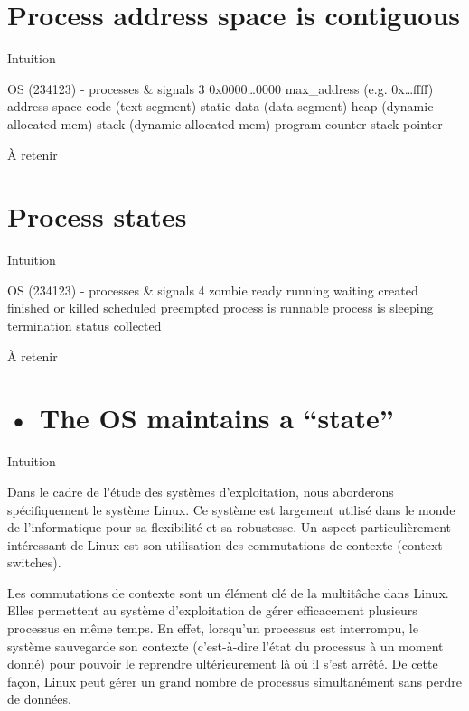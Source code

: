 \documentclass[12pt]{article}
\begin{document}
\section{Process address space is contiguous}
\begin{myvulga}{Intuition}
\end{myvulga}
OS (234123) - processes \& signals
3
0x0000…0000
max\_address
(e.g. 0x…ffff)
address space
code
(text segment)
static data
(data segment)
heap
(dynamic allocated mem)
stack
(dynamic allocated mem)
program counter
stack pointer
\begin{aretenir}{À retenir}
\end{aretenir}

\section{Process states}
\begin{myvulga}{Intuition}
\end{myvulga}
OS (234123) - processes \& signals
4
zombie
ready
running
waiting
created
finished
or killed
scheduled
preempted
process is
runnable
process is
sleeping
termination
status
collected
\begin{aretenir}{À retenir}
\end{aretenir}

\section{• The OS maintains a “state” }
\begin{myvulga}{Intuition}
\end{myvulga}
Dans le cadre de l'étude des systèmes d'exploitation, nous aborderons spécifiquement le système Linux. Ce système est largement utilisé dans le monde de l'informatique pour sa flexibilité et sa robustesse. Un aspect particulièrement intéressant de Linux est son utilisation des commutations de contexte (context switches).

Les commutations de contexte sont un élément clé de la multitâche dans Linux. Elles permettent au système d'exploitation de gérer efficacement plusieurs processus en même temps. En effet, lorsqu'un processus est interrompu, le système sauvegarde son contexte (c'est-à-dire l'état du processus à un moment donné) pour pouvoir le reprendre ultérieurement là où il s'est arrêté. De cette façon, Linux peut gérer un grand nombre de processus simultanément sans perdre de données.
\end{document}
